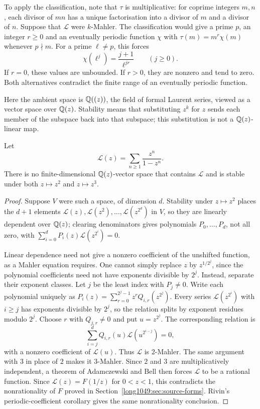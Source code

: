 \documentclass[11pt]{article}
\begin{document}
To apply the classification, note that $\tau$ is multiplicative:
for coprime integers $m,n$, each divisor of $mn$ has a unique
factorisation into a divisor of $m$ and a divisor of $n$.
Suppose that $\mathcal L$ were $k$-Mahler. The classification would give a prime $p$, an integer
$r\ge0$ and an eventually periodic function $\chi$ with
$\tau(m)=m^r\chi(m)$ whenever $p\nmid m$. For a prime $\ell\ne p$,
this forces
\[
 \chi(\ell^j)=\frac{j+1}{\ell^{jr}}\qquad(j\ge0).
\]
If $r=0$, these values are unbounded. If $r>0$, they are nonzero
and tend to zero. Both alternatives contradict the finite range of
an eventually periodic function.


Here the ambient space is $\mathbb{Q}((z))$, the field of formal Laurent
series, viewed as a vector space over $\mathbb{Q}(z)$. Stability means that
substituting $z^k$ for $z$ sends each member of the subspace back into
that subspace; this substitution is not a $\mathbb{Q}(z)$-linear map.

\begin{proposition}\label{long1049:res:nomahler}
Let
\[
 \mathcal L(z)=\sum_{n\ge1}\frac{z^n}{1-z^n}.
\]
There is no finite-dimensional $\mathbb{Q}(z)$-vector space that contains $\mathcal L$
and is stable under both $z\mapsto z^2$ and $z\mapsto z^3$.
\end{proposition}

\begin{proof}
Suppose $V$ were such a space, of dimension $d$.  Stability under $z\mapsto z^2$
places the $d+1$ elements $\mathcal L(z),\mathcal L(z^2),\dots,\mathcal
L(z^{2^{d}})$ in $V$, so they are linearly dependent over $\mathbb{Q}(z)$; clearing
denominators gives polynomials $P_0,\dots,P_d$, not all zero, with
$\sum_{i=0}^{d}P_i(z)\mathcal L(z^{2^i})=0$.

Linear dependence need not give a nonzero coefficient of the
unshifted function, as a Mahler equation requires. One cannot simply
replace $z$ by $z^{1/2^j}$, since the polynomial coefficients need
not have exponents divisible by $2^j$. Instead, separate their
exponent classes. Let $j$ be the least index with $P_j\ne0$. Write each polynomial uniquely as
$P_i(z)=\sum_{r=0}^{2^j-1}z^rQ_{i,r}(z^{2^j})$.
Every series $\mathcal L(z^{2^i})$ with $i\ge j$ has exponents
divisible by $2^j$, so the relation splits by exponent residues modulo
$2^j$. Choose $r$ with $Q_{j,r}\ne0$ and put $u=z^{2^j}$. The
corresponding relation is
\[
 \sum_{i=j}^{d}Q_{i,r}(u)\mathcal L(u^{2^{i-j}})=0,
\]
with a nonzero coefficient of $\mathcal L(u)$. Thus $\mathcal L$ is
$2$-Mahler. The same argument with $3$ in place of $2$ makes it
$3$-Mahler. Since $2$ and
$3$ are multiplicatively independent, a theorem of Adamczewski and Bell
\cite[Thm.~1.1, p.~6]{adamczewskibell2013} then forces $\mathcal L$ to be a rational
function. Since $\mathcal L(z)=F(1/z)$ for $0<z<1$, this contradicts
the nonrationality of $F$ proved in Section~\ref{long1049:sec:source-forms}.
Rivin's periodic-coefficient corollary
\cite[Cor.~6.4, p.~9]{rivin2026} gives the same nonrationality conclusion.
\end{proof}
\end{document}

